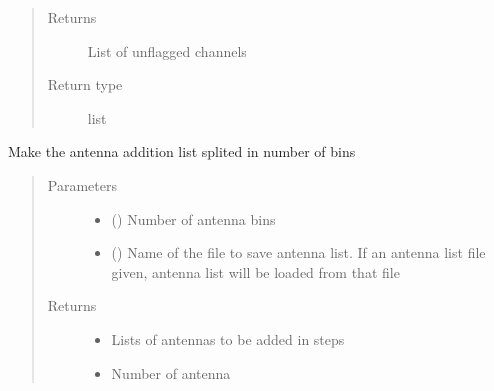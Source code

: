 \documentclass[letterpaper,10pt,english]{sphinxmanual}
\begin{document}
\begin{fulllineitems}
\begin{fulllineitems}
\begin{quote}
\begin{description}
\item[{Returns}] \leavevmode
\sphinxAtStartPar
List of unflagged channels

\item[{Return type}] \leavevmode
\sphinxAtStartPar
list

\end{description}\end{quote}

\end{fulllineitems}


\begin{fulllineitems}
\label{\detokenize{paircars:paircars.access_ms.AccessMS.make_antenna_list}}
\sphinxAtStartPar
Make the antenna addition list splited in number of bins
\begin{quote}\begin{description}
\item[{Parameters}] \leavevmode\begin{itemize}
\item {} 
\sphinxAtStartPar
{} () \textendash{} Number of antenna bins

\item {} 
\sphinxAtStartPar
{} () \textendash{} Name of the file to save antenna list. If an antenna list file given, antenna list will be loaded from that file

\end{itemize}

\item[{Returns}] \leavevmode
\sphinxAtStartPar
\begin{itemize}
\item {} 
\sphinxAtStartPar
{} \textendash{} Lists of antennas to be added in steps

\item {} 
\sphinxAtStartPar
{} \textendash{} Number of antenna


\end{itemize}
\end{description}
\end{quote}
\end{fulllineitems}
\end{fulllineitems}
\end{document}
